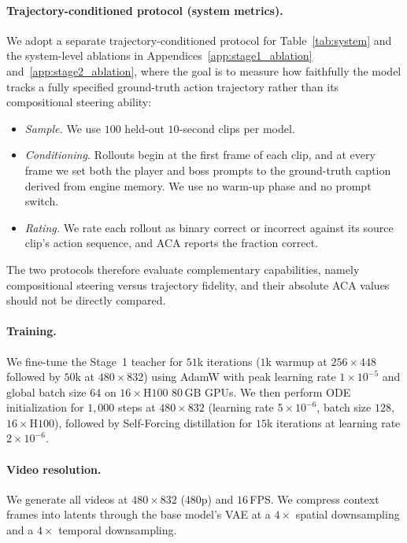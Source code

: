 \paragraph{Trajectory-conditioned protocol (system metrics).}
We adopt a separate trajectory-conditioned protocol for Table~\ref{tab:system} and the system-level ablations in Appendices~\ref{app:stage1_ablation} and~\ref{app:stage2_ablation}, where the goal is to measure how faithfully the model tracks a fully specified ground-truth action trajectory rather than its compositional steering ability:
\begin{itemize}[leftmargin=*,topsep=2pt,itemsep=2pt]
  \item \emph{Sample.} We use $100$ held-out $10$-second clips per model.
  \item \emph{Conditioning.} Rollouts begin at the first frame of each clip, and at every frame we set both the player and boss prompts to the ground-truth caption derived from engine memory. We use no warm-up phase and no prompt switch.
  \item \emph{Rating.} We rate each rollout as binary correct or incorrect against its source clip's action sequence, and ACA reports the fraction correct.
\end{itemize}
The two protocols therefore evaluate complementary capabilities, namely compositional steering versus trajectory fidelity, and their absolute ACA values should not be directly compared.

\paragraph{Training.}
We fine-tune the Stage~1 teacher for $51$k iterations ($1$k warmup at $256\times448$ followed by $50$k at $480\times832$) using AdamW with peak learning rate $1\times10^{-5}$ and global batch size $64$ on $16\times$H$100$ $80$\,GB GPUs. We then perform ODE initialization for $1{,}000$ steps at $480\times832$ (learning rate $5\times10^{-6}$, batch size $128$, $16\times$H$100$), followed by Self-Forcing distillation for $15$k iterations at learning rate $2\times10^{-6}$.

\paragraph{Video resolution.}
We generate all videos at $480\times832$ ($480$p) and $16$\,FPS. We compress context frames into latents through the base model's VAE at a $4\times$ spatial downsampling and a $4\times$ temporal downsampling.


